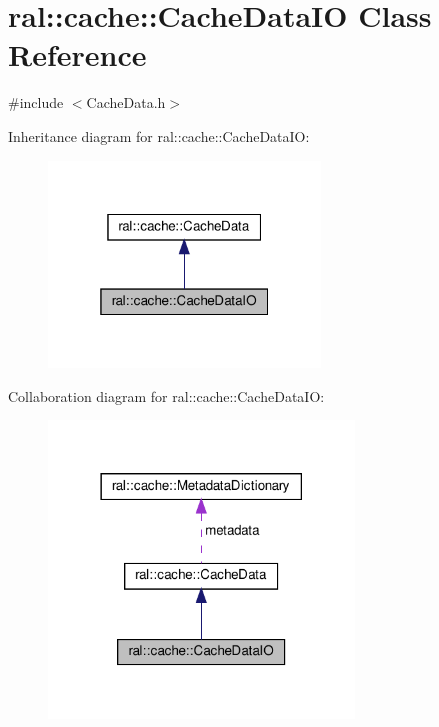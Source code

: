 \hypertarget{classral_1_1cache_1_1CacheDataIO}{}\section{ral\+:\+:cache\+:\+:Cache\+Data\+IO Class Reference}
\label{classral_1_1cache_1_1CacheDataIO}


{\ttfamily \#include $<$Cache\+Data.\+h$>$}



Inheritance diagram for ral\+:\+:cache\+:\+:Cache\+Data\+IO\+:\nopagebreak
\begin{figure}[H]
\begin{center}
\leavevmode
\includegraphics[width=205pt]{classral_1_1cache_1_1CacheDataIO__inherit__graph}
\end{center}
\end{figure}


Collaboration diagram for ral\+:\+:cache\+:\+:Cache\+Data\+IO\+:\nopagebreak
\begin{figure}[H]
\begin{center}
\leavevmode
\includegraphics[width=230pt]{classral_1_1cache_1_1CacheDataIO__coll__graph}
\end{center}
\end{figure}

